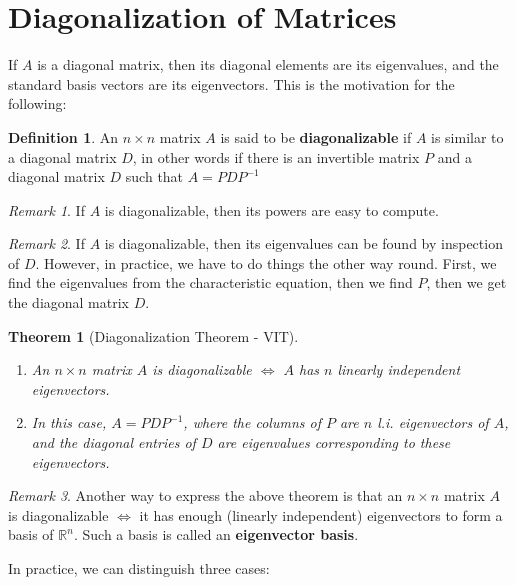 \documentclass[]{extarticle}
\theoremstyle{Simple}
\newtheorem{thm}{Theorem}[section]
\theoremstyle{definition}
\newtheorem{defn}{Definition}[section]
\theoremstyle{remark}
\newtheorem*{rem}{Remark}
\theoremstyle{example}
\begin{document}
\section{Diagonalization of Matrices}

If $A$ is a diagonal matrix, then its diagonal elements are its
eigenvalues, and the standard basis vectors are its
eigenvectors. This is the motivation for the following:

\begin{defn}
An $n \times n$ matrix $A$ is said to be \textbf{diagonalizable}
if $A$ is similar to a diagonal matrix $D$, in other words if
there is an invertible matrix $P$ and a diagonal matrix $D$
such that $A = PDP^{-1}$
\end{defn}

\begin{rem}
If $A$ is diagonalizable, then its powers are easy
to compute.
\end{rem}

\begin{rem}
If $A$ is diagonalizable, then its eigenvalues can
be found by inspection of $D$. However, in practice, we
have to do things the other way round. First, we find the
eigenvalues from the characteristic equation, then we find
$P$, then we get the diagonal matrix $D$.
\end{rem}

\begin{thm}[Diagonalization Theorem - VIT]
\label{thm:dt-vit}
\hfill

\begin{enumerate}
\item An $n \times n$ matrix $A$ is diagonalizable $\iff$ $A$ has $n$ linearly independent eigenvectors.
\item In this case, $A = PDP^{-1}$, where the columns of $P$ are $n$ l.i. eigenvectors of $A$, and the diagonal entries of $D$ are eigenvalues corresponding to these eigenvectors.
\end{enumerate}

\end{thm}

\begin{rem}
Another way to express the above theorem is
that an $n \times n$ matrix $A$ is diagonalizable $\iff$ it has
enough (linearly independent) eigenvectors to form a
basis of $\mathbb{R}^{n}$. Such a basis is called an \textbf{eigenvector basis}.
\end{rem}

In practice, we can distinguish three cases:
\end{document}
